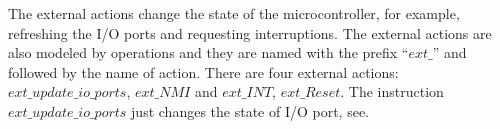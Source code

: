 \documentclass[a4paper]{llncs}
\begin{document}
%
%
%
%
%
The external actions change the state of the microcontroller, for example,
refreshing the I/O ports and requesting interruptions. The external actions are also
modeled by operations and they are named with the prefix ``$ext\_$'' and
followed by the name of action. There are four external actions:
$ext\_update\_io\_ports$, $ext\_NMI$ and $ext\_INT$, $ext\_Reset$. The
instruction $ext\_update\_io\_ports$ just changes the state of I/O port, see.
\end{document}
